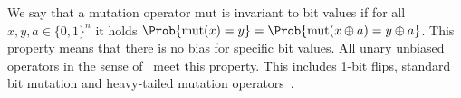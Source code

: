 
    We say that a mutation operator $\mathrm{mut}$ is invariant to bit values if for all 
    $x, y, a \in \{0, 1\}^n$ 
    it holds $\Prob{\mathrm{mut}(x) = y} = \Prob{\mathrm{mut}(x \oplus a) =  y \oplus a}$.
    This property means that there is no bias for specific bit values. All unary unbiased operators in the sense of~\citet{Lehre2012} meet this property.  This includes 1-bit flips, standard bit mutation and heavy-tailed mutation operators~\cite{Doerr2017-fastGA}.

